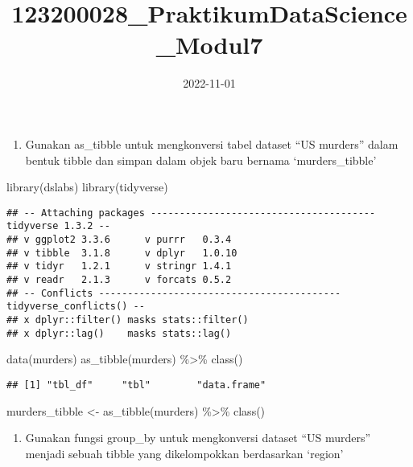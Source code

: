 \documentclass[
]{article}
\title{123200028\_PraktikumDataScience\_Modul7}
\author{}
\date{\vspace{-2.5em}2022-11-01}
\newenvironment{Shaded}{\begin{snugshade}}{\end{snugshade}}
\newcommand{\FunctionTok}[1]{\textcolor[rgb]{0.00,0.00,0.00}{#1}}
\newcommand{\NormalTok}[1]{#1}
\newcommand{\OtherTok}[1]{\textcolor[rgb]{0.56,0.35,0.01}{#1}}
\newcommand{\SpecialCharTok}[1]{\textcolor[rgb]{0.00,0.00,0.00}{#1}}
\providecommand{\tightlist}{%
  \setlength{\itemsep}{0pt}\setlength{\parskip}{0pt}}
\begin{document}
\maketitle

\begin{enumerate}
\def\labelenumi{\arabic{enumi}.}
\tightlist
\item
  Gunakan as\_tibble untuk mengkonversi tabel dataset ``US murders''
  dalam bentuk tibble dan simpan dalam objek baru bernama
  `murders\_tibble'
\end{enumerate}

\begin{Shaded}
\begin{Highlighting}[]
\FunctionTok{library}\NormalTok{(dslabs)}
\FunctionTok{library}\NormalTok{(tidyverse)}
\end{Highlighting}
\end{Shaded}

\begin{verbatim}
## -- Attaching packages --------------------------------------- tidyverse 1.3.2 --
## v ggplot2 3.3.6      v purrr   0.3.4 
## v tibble  3.1.8      v dplyr   1.0.10
## v tidyr   1.2.1      v stringr 1.4.1 
## v readr   2.1.3      v forcats 0.5.2 
## -- Conflicts ------------------------------------------ tidyverse_conflicts() --
## x dplyr::filter() masks stats::filter()
## x dplyr::lag()    masks stats::lag()
\end{verbatim}

\begin{Shaded}
\begin{Highlighting}[]
\FunctionTok{data}\NormalTok{(murders)}
\FunctionTok{as\_tibble}\NormalTok{(murders) }\SpecialCharTok{\%\textgreater{}\%} \FunctionTok{class}\NormalTok{()}
\end{Highlighting}
\end{Shaded}

\begin{verbatim}
## [1] "tbl_df"     "tbl"        "data.frame"
\end{verbatim}

\begin{Shaded}
\begin{Highlighting}[]
\NormalTok{murders\_tibble }\OtherTok{\textless{}{-}} \FunctionTok{as\_tibble}\NormalTok{(murders) }\SpecialCharTok{\%\textgreater{}\%} \FunctionTok{class}\NormalTok{() }
\end{Highlighting}
\end{Shaded}

\begin{enumerate}
\def\labelenumi{\arabic{enumi}.}
\setcounter{enumi}{1}
\tightlist
\item
  Gunakan fungsi group\_by untuk mengkonversi dataset ``US murders''
  menjadi sebuah tibble yang dikelompokkan berdasarkan `region'
\end{enumerate}
\end{document}
